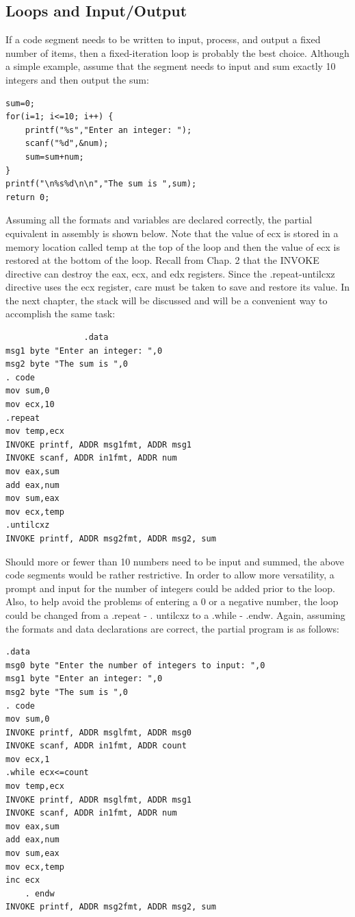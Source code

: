 \documentclass[10pt]{book}
\begin{document}
\subsection{Loops and Input/Output}
If a code segment needs to be written to input, process, and output a fixed number of items, then a fixed-iteration loop is probably the best choice. Although a simple example, assume that the segment needs to input and sum exactly 10 integers and then output the sum:


\begin{verbatim}
sum=0;
for(i=1; i<=10; i++) {
    printf("%s","Enter an integer: ");
    scanf("%d",&num);
    sum=sum+num;
}
printf("\n%s%d\n\n","The sum is ",sum);
return 0;
\end{verbatim}

Assuming all the formats and variables are declared correctly, the partial equivalent in assembly is shown below. Note that the value of ecx is stored in a memory location called temp at the top of the loop and then the value of ecx is restored at the bottom of the loop. Recall from Chap. 2 that the INVOKE directive can destroy the eax, ecx, and edx registers. Since the .repeat-untilcxz directive uses the ecx register, care must be taken to save and restore its value. In the next chapter, the stack will be discussed and will be a convenient way to accomplish the same task:

\begin{verbatim}
                .data
msg1 byte "Enter an integer: ",0
msg2 byte "The sum is ",0
. code
mov sum,0
mov ecx,10
.repeat
mov temp,ecx
INVOKE printf, ADDR msg1fmt, ADDR msg1
INVOKE scanf, ADDR in1fmt, ADDR num
mov eax,sum
add eax,num
mov sum,eax
mov ecx,temp
.untilcxz
INVOKE printf, ADDR msg2fmt, ADDR msg2, sum
\end{verbatim}

Should more or fewer than 10 numbers need to be input and summed, the above code segments would be rather restrictive. In order to allow more versatility, a prompt and input for the number of integers could be added prior to the loop. Also, to help avoid the problems of entering a 0 or a negative number, the loop could be changed from a .repeat - . untilcxz to a .while - .endw. Again, assuming the formats and data declarations are correct, the partial program is as follows:

\begin{verbatim}
.data
msg0 byte "Enter the number of integers to input: ",0
msg1 byte "Enter an integer: ",0
msg2 byte "The sum is ",0
. code
mov sum,0
INVOKE printf, ADDR msglfmt, ADDR msg0
INVOKE scanf, ADDR in1fmt, ADDR count
mov ecx,1
.while ecx<=count
mov temp,ecx
INVOKE printf, ADDR msglfmt, ADDR msg1
INVOKE scanf, ADDR in1fmt, ADDR num
mov eax,sum
add eax,num
mov sum,eax
mov ecx,temp
inc ecx
    . endw
INVOKE printf, ADDR msg2fmt, ADDR msg2, sum
\end{verbatim}
\end{document}
